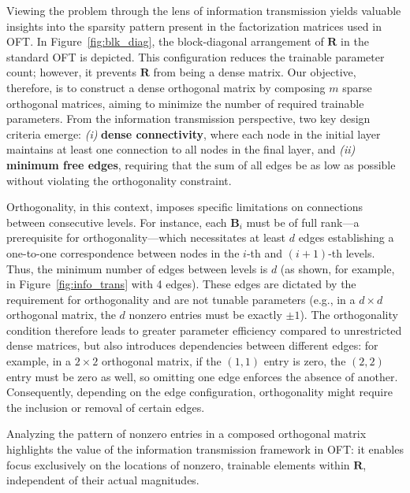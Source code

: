 Viewing the problem through the lens of information transmission yields valuable insights into the sparsity pattern present in the factorization matrices used in OFT. In Figure~\ref{fig:blk_diag}, the block-diagonal arrangement of $\bm{R}$ in the standard OFT is depicted. This configuration reduces the trainable parameter count; however, it prevents $\bm{R}$ from being a dense matrix. Our objective, therefore, is to construct a dense orthogonal matrix by composing $m$ sparse orthogonal matrices, aiming to minimize the number of required trainable parameters. From the information transmission perspective, two key design criteria emerge: \emph{(i)} \textbf{dense connectivity}, where each node in the initial layer maintains at least one connection to all nodes in the final layer, and \emph{(ii)} \textbf{minimum free edges}, requiring that the sum of all edges be as low as possible without violating the orthogonality constraint. 

Orthogonality, in this context, imposes specific limitations on connections between consecutive levels. For instance, each $\bm{B}_i$ must be of full rank—a prerequisite for orthogonality—which necessitates at least $d$ edges establishing a one-to-one correspondence between nodes in the $i$-th and $(i+1)$-th levels. Thus, the minimum number of edges between levels is $d$ (as shown, for example, in Figure~\ref{fig:info_trans} with 4 edges). These edges are dictated by the requirement for orthogonality and are not tunable parameters (e.g., in a $d\times d$ orthogonal matrix, the $d$ nonzero entries must be exactly $\pm 1$). The orthogonality condition therefore leads to greater parameter efficiency compared to unrestricted dense matrices, but also introduces dependencies between different edges: for example, in a $2\times 2$ orthogonal matrix, if the $(1,1)$ entry is zero, the $(2,2)$ entry must be zero as well, so omitting one edge enforces the absence of another. Consequently, depending on the edge configuration, orthogonality might require the inclusion or removal of certain edges.

Analyzing the pattern of nonzero entries in a composed orthogonal matrix highlights the value of the information transmission framework in OFT: it enables focus exclusively on the locations of nonzero, trainable elements within $\bm{R}$, independent of their actual magnitudes.

